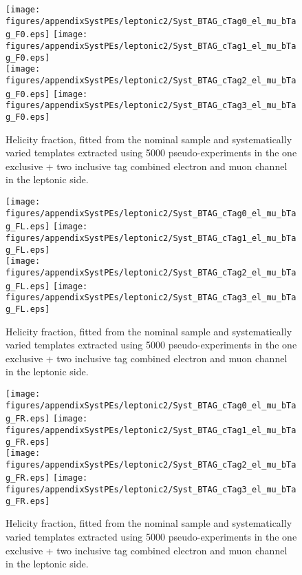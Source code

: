 \begin{figure}[!hb]
\begin{center}
        \texttt{[image: figures/appendixSystPEs/leptonic2/Syst\_BTAG\_cTag0\_el\_mu\_bTag\_F0.eps]}
        \texttt{[image: figures/appendixSystPEs/leptonic2/Syst\_BTAG\_cTag1\_el\_mu\_bTag\_F0.eps]}\\
        \texttt{[image: figures/appendixSystPEs/leptonic2/Syst\_BTAG\_cTag2\_el\_mu\_bTag\_F0.eps]}
        \texttt{[image: figures/appendixSystPEs/leptonic2/Syst\_BTAG\_cTag3\_el\_mu\_bTag\_F0.eps]}
        
\caption{Helicity fraction, \fo fitted from the nominal \ttbar sample and systematically varied templates extracted using 5000 pseudo-experiments in the one exclusive + two inclusive \bt tag combined electron and muon channel in the leptonic side. }
\label{fig:systematicVar_lep_f0_elmu2incl_btag2}
\end{center}
\end{figure}

\begin{figure}[!hb]
\begin{center}
        \texttt{[image: figures/appendixSystPEs/leptonic2/Syst\_BTAG\_cTag0\_el\_mu\_bTag\_FL.eps]}
        \texttt{[image: figures/appendixSystPEs/leptonic2/Syst\_BTAG\_cTag1\_el\_mu\_bTag\_FL.eps]}\\
        \texttt{[image: figures/appendixSystPEs/leptonic2/Syst\_BTAG\_cTag2\_el\_mu\_bTag\_FL.eps]}
        \texttt{[image: figures/appendixSystPEs/leptonic2/Syst\_BTAG\_cTag3\_el\_mu\_bTag\_FL.eps]}
        
\caption{Helicity fraction, \fl fitted from the nominal \ttbar sample and systematically varied templates extracted using 5000 pseudo-experiments in the one exclusive + two inclusive \bt tag combined electron and muon channel in the leptonic side. }
\label{fig:systematicVar_lep_fL_elmu2incl_btag2}
\end{center}
\end{figure}

\begin{figure}[!hb]
\begin{center}
        \texttt{[image: figures/appendixSystPEs/leptonic2/Syst\_BTAG\_cTag0\_el\_mu\_bTag\_FR.eps]}
        \texttt{[image: figures/appendixSystPEs/leptonic2/Syst\_BTAG\_cTag1\_el\_mu\_bTag\_FR.eps]}\\
        \texttt{[image: figures/appendixSystPEs/leptonic2/Syst\_BTAG\_cTag2\_el\_mu\_bTag\_FR.eps]}
        \texttt{[image: figures/appendixSystPEs/leptonic2/Syst\_BTAG\_cTag3\_el\_mu\_bTag\_FR.eps]}
        
\caption{Helicity fraction, \fr fitted from the nominal \ttbar sample and systematically varied templates extracted using 5000 pseudo-experiments in the one exclusive + two inclusive \bt tag combined electron and muon channel in the leptonic side. }
\label{fig:systematicVar_lep_fR_elmu2incl_btag2}
\end{center}
\end{figure}

